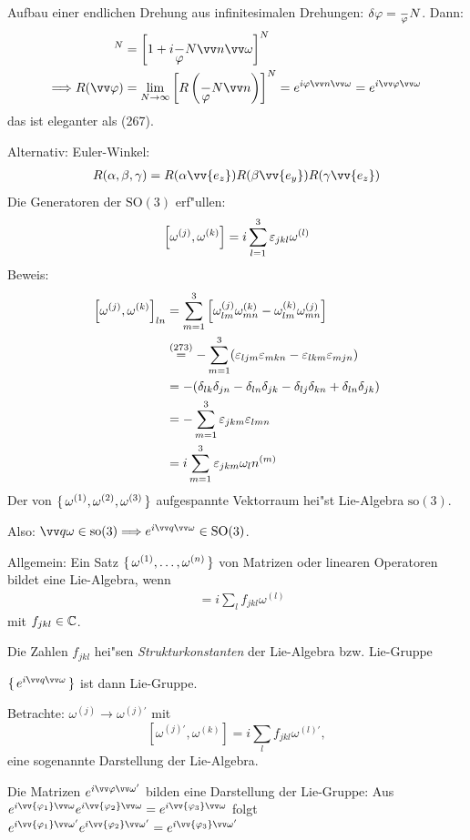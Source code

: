 \documentclass[a4paper]{scrartcl}
\newcommand{\CC}{\ensuremath \mathbb{C}}
\newcommand{\eps}{\ensuremath \varepsilon}
\renewcommand{\phi}{\ensuremath \varphi}
\newcommand{\eqn}[1]{\begin{align} #1 \end{align}}
\newcommand{\eqnnon}[1]{\begin{align*} #1 \end{align*}}
\begin{document}
{Aufbau einer endlichen Drehung aus infinitesimalen Drehungen: $\delta \phi = \frac \phi N$. Dann:
\begin{align}
[ R( \delta \phi \vv n) ]^N & = \left[ 1 + i \frac \phi N \vv n \vv \omega\right]^N \notag \\
\Longrightarrow R(\vv \phi)&  = \lim_{N \rightarrow \infty} \left[  R \left( \frac \phi N \vv n \right) \right]^N = e^{i \phi \vv n \vv \omega} = e^{i \vv \phi \vv \omega}
\end{align}
das ist eleganter als (267).

Alternativ: Euler-Winkel:
\eqn{
R(\alpha, \beta, \gamma) = R( \alpha \vv{e_z}) R( \beta \vv{e_y}) R( \gamma \vv{e_z})
}
Die Generatoren der $\mathrm{SO}(3)$ erf"ullen:
\eqn{ \left[ \omega^{(j)}, \omega^{(k)} \right] = i \sum_{l=1}^3 \eps_{jkl} \omega^{(l)}}
Beweis:
\eqnnon{
\left[ \omega^{(j)}, \omega^{(k)} \right]_{ln} & = \sum_{m=1}^3 \left[ \omega^{(j)}_{lm} \omega_{mn}^{(k)} - \omega_{lm}^{(k)} \omega_{mn}^{(j)} \right] \\
& \stackrel{(273)}= - \sum_{m=1}^3 ( \eps_{ljm} \eps_{mkn} - \eps_{lkm} \eps_{mjn} ) \\
& = - ( \delta_{lk} \delta_{jn} - \delta_{ln} \delta_{jk} - \delta_{lj} \delta_{kn} + \delta_{ln}\delta_{jk} ) \\
& = - \sum_{m=1}^3 \eps_{jkm} \eps_{lmn} \\
& = i \sum_{m=1}^3 \eps_{jkm} \omega_ln^{(m)}
}
Der von $\set{ \omega^{(1)}, \omega^{(2)}, \omega^{(3)} }$ aufgespannte Vektorraum hei"st Lie-Algebra $\mathrm{so}(3)$.

Also: $\vv q \omega \in \mathrm{so}(3) \Longrightarrow e^{i \vv q \vv \omega} \in \mathrm{SO}(3)$.

Allgemein: Ein Satz $\set{ \omega^{(1)}, \ldots, \omega^{(n)} }$ von Matrizen oder linearen Operatoren bildet eine Lie-Algebra, wenn
\eqn{
[\omega^{(j)}, \omega^{(k)} ] & = i \sum_l f_{jkl} \omega^{(l)}
}
mit $f_{jkl} \in \CC$.

Die Zahlen $f_{jkl}$ hei"sen \emph{Strukturkonstanten} der Lie-Algebra bzw. Lie-Gruppe

$\set{ e^{i \vv q \vv \omega} }$ ist dann Lie-Gruppe.

Betrachte: $\omega^{(j)} \longrightarrow \omega^{(j)'}$ mit
$$[\omega^{(j)'}, \omega^{(k)} ] = i \sum_l f_{jkl} \omega^{(l)'},$$
eine sogenannte Darstellung der Lie-Algebra.

Die Matrizen $e^{i \vv \phi \vv \omega'}$ bilden eine Darstellung der Lie-Gruppe: Aus $e^{i \vv{\phi_1} \vv \omega} e^{i \vv{\phi_2} \vv \omega} = e^{i \vv{\phi_3} \vv \omega}$ folgt $e^{i \vv{\phi_1} \vv \omega'} e^{i \vv{\phi_2} \vv \omega'} = e^{i \vv{\phi_3} \vv \omega'}$

}
\end{document}
